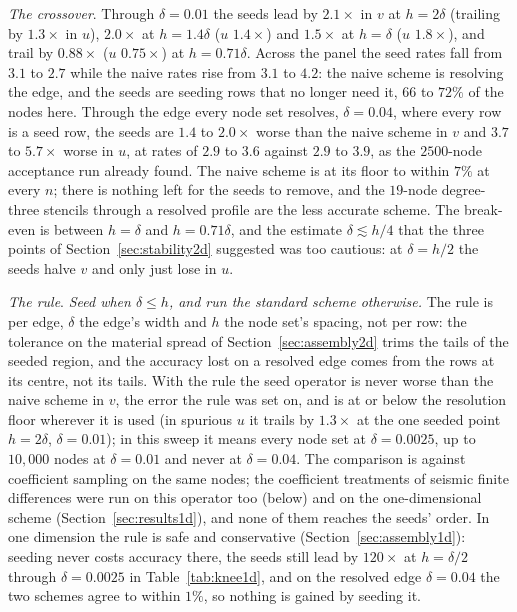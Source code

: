 \documentclass[11pt]{amsart}
\theoremstyle{definition}
\theoremstyle{remark}
\newcommand{\para}[1]{\par\smallskip\noindent\textit{#1}.\enspace}
\begin{document}
\para{The crossover}
Through $\delta = 0.01$ the seeds lead by $2.1\times$ in $v$ at
$h = 2\delta$ (trailing by $1.3\times$ in $u$), $2.0\times$ at $h = 1.4\delta$ ($u$
$1.4\times$) and $1.5\times$ at $h = \delta$ ($u$ $1.8\times$), and trail
by $0.88\times$ ($u$ $0.75\times$) at $h = 0.71\delta$. Across the panel
the seed rates fall from $3.1$ to $2.7$ while the naive rates rise from
$3.1$ to $4.2$: the naive scheme is resolving the edge, and the seeds are
seeding rows that no longer need it, $66$ to $72\%$ of the nodes here.
Through the edge every node set resolves, $\delta = 0.04$, where every
row is a seed row, the seeds are $1.4$ to $2.0\times$ worse than the
naive scheme in $v$ and $3.7$ to $5.7\times$ worse in $u$, at rates of
$2.9$ to $3.6$ against $2.9$ to $3.9$, as the $2500$-node acceptance run
already found. The naive scheme is at its floor to within $7\%$ at every
$n$; there is nothing left for the seeds to remove, and the $19$-node
degree-three stencils through a resolved profile are the less accurate
scheme. The break-even is between $h = \delta$ and $h = 0.71\delta$, and
the estimate $\delta \lesssim h / 4$ that the three points of
Section~\ref{sec:stability2d} suggested was too cautious: at
$\delta = h / 2$ the seeds halve $v$ and only just lose in $u$.

\para{The rule}
\emph{Seed when $\delta \le h$, and run the standard scheme otherwise.}
The rule is per edge, $\delta$ the edge's width and $h$ the node set's
spacing, not per row: the tolerance on the material spread of
Section~\ref{sec:assembly2d} trims the tails of the seeded region, and
the accuracy lost on a resolved edge comes from the rows at its centre,
not its tails. With the rule the seed operator is never worse than the
naive scheme in $v$, the error the rule was set on, and is at or below
the resolution floor wherever it is used (in spurious $u$ it trails by
$1.3\times$ at the one seeded point $h = 2\delta$, $\delta = 0.01$); in this sweep it means every node set at $\delta = 0.0025$, up to
$10{,}000$ nodes at $\delta = 0.01$ and never at $\delta = 0.04$. The
comparison is against coefficient sampling on the same nodes; the
coefficient treatments of seismic finite differences were run on this
operator too (below) and on the one-dimensional scheme
(Section~\ref{sec:results1d}), and none of them reaches the seeds' order.
In one dimension the rule is safe and conservative
(Section~\ref{sec:assembly1d}): seeding never costs accuracy there, the
seeds still lead by $120\times$ at $h = \delta / 2$ through
$\delta = 0.0025$ in Table~\ref{tab:knee1d}, and on the resolved edge
$\delta = 0.04$ the two schemes agree to within $1\%$, so nothing is
gained by seeding it.
\end{document}
